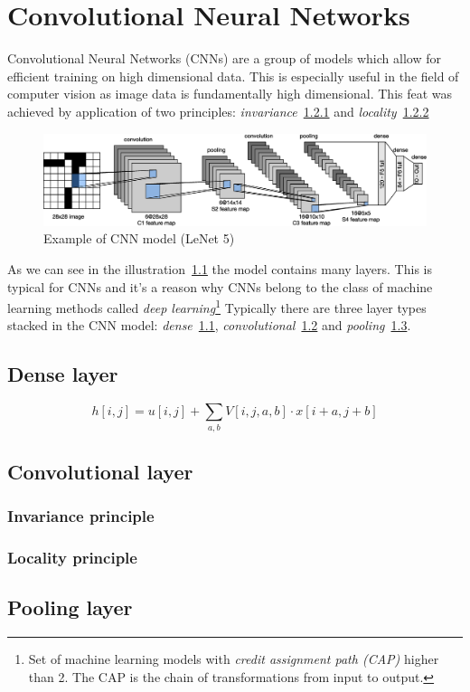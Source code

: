\chapter{Convolutional Neural Networks}\label{ch:cnn}
Convolutional Neural Networks (CNNs) are a group of models which allow for efficient training on high dimensional data.
This is especially useful in the field of computer vision as image data is fundamentally high dimensional.
This feat was achieved by application of two principles: \textit{invariance}~\ref{subsec:invariance} and
\textit{locality}~\ref{subsec:locality}

\begin{figure}[H]
    \centering
    \includegraphics[width=\columnwidth]{images/cnn/lenet.eps}
    \caption{Example of CNN model (LeNet 5)~\cite{CNN}}
    \label{fig:cnn}
\end{figure}

As we can see in the illustration~\ref{fig:cnn} the model contains many layers.
This is typical for CNNs and it's a reason why CNNs belong to the class of machine learning methods called
\textit{deep learning}\footnote{Set of machine learning models with
\textit{credit assignment path (CAP)} higher than 2.
The CAP is the chain of transformations from input to output.}
Typically there are three layer types stacked in the CNN model: \textit{dense}~\ref{sec:dense},
\textit{convolutional}~\ref{sec:convolutional} and \textit{pooling}~\ref{sec:pooling}.

\section{Dense layer}\label{sec:dense}

\begin{equation}
    h[i, j] = u[i,j] + \sum_{a,b} V[i,j,a,b] \cdot x[i+a,j+b]
\end{equation}

\section{Convolutional layer}\label{sec:convolutional}

\subsection{Invariance principle}\label{subsec:invariance}
\subsection{Locality principle}\label{subsec:locality}

\section{Pooling layer}\label{sec:pooling}

